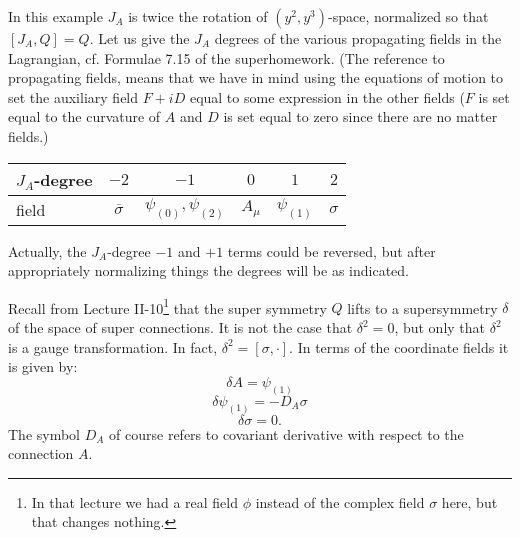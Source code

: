 In this example $J_A$ is twice the rotation of $(y^2,y^3)$-space,
normalized so that $[J_A,Q]=Q$.
Let us give the $J_A$ degrees of the various propagating fields in the
Lagrangian, cf. Formulae 7.15 of the superhomework. (The reference to
propagating fields, means that we have 
in mind using the equations of motion to set the auxiliary field
$F+iD$ equal to some expression in the other fields ($F$ is set
equal to the curvature of $A$ and $D$ is set equal to zero since there
are no matter fields.)
\begin{center}
\begin{tabular}{|l|c|c|c|c|c|}\hline
$J_A$-degree & $-2$ & $-1$ & $0$ & $1$ & $2$ \\ \hline
field & $\overline\sigma$ & $\psi_{(0)},\psi_{(2)}$ & $A_\mu$ &
$\psi_{(1)}$ & $\sigma$\\ \hline
\end{tabular}
\end{center}
Actually, the $J_A$-degree $-1$ and $+1$  terms could be reversed, but
after appropriately normalizing things the degrees will be as
indicated.

Recall from Lecture II-10\footnote{In that lecture we had a real field
$\phi$ instead of the complex field $\sigma$ here, but that changes
nothing.}  that
the super symmetry $Q$ lifts to a supersymmetry $\delta$ of the space
of super connections. It is not the case that $\delta^2=0$, but only
that $\delta^2$ is a gauge transformation. In fact,
$\delta^2=[\sigma,\cdot]$. In terms of the
coordinate fields  it is given by:
$$\delta  A=\psi_{(1)}$$
$$\delta\psi_{(1)}=-D_A\sigma$$
$$\delta\sigma=0.$$
The symbol $D_A$ of course refers to covariant derivative with respect
to the connection $A$.

